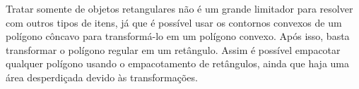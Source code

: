 Tratar somente de objetos retangulares não é um grande limitador para resolver com outros tipos
de itens, já que é possível usar os contornos convexos de um polígono côncavo para transformá-lo
em um polígono convexo.
Após isso, basta transformar o polígono regular em um retângulo.
Assim é possível empacotar qualquer polígono usando o empacotamento de retângulos, ainda que
haja uma área desperdiçada devido às transformações.



